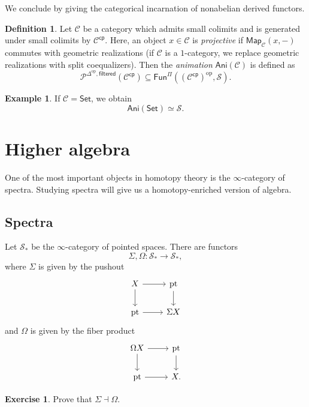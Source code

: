 \documentclass[10pt, oneside]{memoir}
\theoremstyle{definition}
\newtheorem{defn}[thm]{Definition}
\newtheorem{exm}[thm]{Example}
\newtheorem{exer}[thm]{Exercise}
\theoremstyle{remark}
\theoremstyle{plain}
\theoremstyle{definition}
\theoremstyle{remark}
\newcommand{\mc}[1]{\mathcal{#1}}
\newcommand{\mr}[1]{\mathrm{#1}}
\newcommand{\ms}[1]{\mathsf{#1}}
\newcommand{\1}{\mathbf{1}}
\newcommand{\2}{\mathbf{2}}
\newcommand{\3}{\mathbf{3}}
\newcommand{\pt}{\mr{pt}}
\DeclareMathOperator{\op}{op}
\begin{document}
We conclude by giving the categorical incarnation of nonabelian derived functors.
\begin{defn}
    Let \(\mc{C} \) be a category which admits small colimits and is generated under small colimits by \(\mc{C}^{\ms{cp}} \). Here, an object \(x \in \mc{C} \) is \textit{projective} if \(\ms{Map}_{\mc{C}}(x,-) \) commutes with geometric realizations (if \(\mc{C} \) is a \(1 \)-category, we replace geometric realizations with split coequalizers). Then the \textit{animation} \(\ms{Ani}(\mc{C}) \) is defined as
    \[ \mc{P}^{\Delta^{\op}, \ms{filtered}}(\mc{C}^{\ms{cp}}) \subseteq \ms{Fun}^{\Pi} ((\mc{C}^{\ms{cp}})^{\op}, \mc{S}). \]
\end{defn}

\begin{exm}
    If \(\mc{C} = \ms{Set} \), we obtain
    \[ \ms{Ani}(\ms{Set}) \simeq \mc{S}. \]
\end{exm}




\section{Higher algebra}%
\label{sec:Higher algebra}

One of the most important objects in homotopy theory is the \(\infty \)-category of spectra. Studying spectra will give us a homotopy-enriched version of algebra.

\subsection{Spectra}%
\label{sub:Spectra}

Let \(\mc{S}_* \) be the \(\infty \)-category of pointed spaces. There are functors
\[ \Sigma, \Omega \colon \mc{S}_* \to \mc{S}_*, \]
where \(\Sigma \) is given by the pushout
\begin{equation*}
\begin{tikzcd}
    X \ar{r} \ar{d} & \pt \ar{d} \\
    \pt \ar{r} & \Sigma X
\end{tikzcd}
\end{equation*}
and \(\Omega \) is given by the fiber product
\begin{equation*}
\begin{tikzcd}
    \Omega X \ar{r} \ar{d} & \pt \ar{d} \\
    \pt \ar{r} & X.
\end{tikzcd}
\end{equation*}
\begin{exer}
    Prove that \(\Sigma \dashv \Omega \).
\end{exer}
\end{document}
